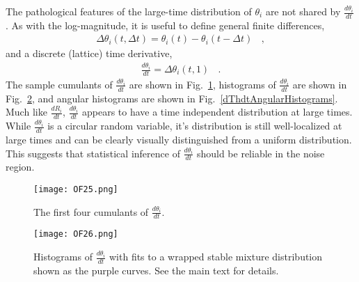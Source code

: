 The pathological features of the large-time distribution of $\theta_i$ are not shared by $\frac{d\theta_i}{dt}$. 
As with the log-magnitude, 
it is useful to 
define general finite differences,
%
\begin{equation}
  \begin{split}
    \Delta\theta_i(t,\Delta t) = \theta_i(t) - \theta_i(t-\Delta t)
    \ \ \ \  ,
  \end{split}
  \label{DeltaThdef}
\end{equation}
%
and a discrete (lattice) time derivative,
%
\begin{equation}
  \begin{split}
    \frac{d\theta_i}{dt} = \Delta\theta_i(t, 1)
    \ \ \ \  .
  \end{split}
  \label{dThdtdef}
\end{equation}
%
The sample cumulants of $\frac{d\theta_i}{dt}$ are shown in Fig.~\ref{dThdtCumulants}, 
histograms of $\frac{d\theta_i}{dt}$ are shown in Fig.~\ref{dThdtHistograms}, and angular histograms are 
shown in Fig.~\ref{dThdtAngularHistograms}. 
Much like $\frac{dR_i}{dt}$, $\frac{d\theta_i}{dt}$ appears to have a time independent distribution at large times. While $\frac{d\theta_i}{dt}$ is a circular random variable, it's distribution is still well-localized at large times and can be clearly visually distinguished from a uniform distribution. This suggests that statistical inference of $\frac{d\theta_i}{dt}$ should be reliable in the noise region.
%
\begin{figure}[!ht]
  \centering
  \texttt{[image: OF25.png]}
  \caption{The first four cumulants of $\frac{d\theta_i}{dt}$.}
  \label{dThdtCumulants}
\end{figure}
%
\begin{figure}[!ht]
  \centering
  \texttt{[image: OF26.png]}
  \caption{
  Histograms of $\frac{d\theta_i}{dt}$ with fits to  a wrapped stable mixture distribution shown as the purple curves. 
  See the main text for details.
  }
  \label{dThdtHistograms}
\end{figure}

